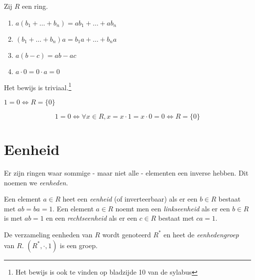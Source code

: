 \documentclass[a4paper,12pt,oneside]{book}
\begin{document}
\begin{stelling}[Sylabus 1.8] Zij $R$ een ring.
\begin{enumerate}[label=(\roman*)]
	\item $a(b_1 + \ldots + b_n) = ab_1 + \ldots + ab_n$
	\item $(b_1 + \ldots + b_n)a = b_1 a + \ldots + b_n a$
	\item $a(b-c) = ab -ac$
	\item $a\cdot 0 = 0 \cdot a = 0$
\end{enumerate}
\end{stelling}
\begin{bewijs}
Het bewijs is triviaal.\footnote{Het bewijs is ook te vinden op bladzijde 10 van de sylabus}
\end{bewijs}

\begin{gevolg}
$1 = 0 \iff R = \{0\}$
\end{gevolg}

\begin{bewijs}
\[
1 = 0 \iff \forall x \in R, x = x \cdot 1 = x \cdot 0 = 0 \iff R = \{0\}
\]
\end{bewijs}

\section{Eenheid}
Er zijn ringen waar sommige - maar niet alle - elementen een inverse hebben. Dit noemen we \textit{eenheden}.

\begin{definitie}
Een element $a \in R$ heet een \textit{eenheid} (of inverteerbaar) als er een
$b \in R$ bestaat met $ab = ba = 1$. Een element $a \in R$ noemt men een \textit{linkseenheid} als er een $b \in R$ is met $ab = 1$ en een \textit{rechtseenheid} als er een $c \in R$ bestaat met $ca = 1$.
\end{definitie}

\begin{definitie}
De verzameling eenheden van $R$ wordt genoteerd $R^*$ en heet de \textit{eenhedengroep} van $R$. $(R^*, \cdot, 1)$ is een groep.
\end{definitie}
\end{document}
